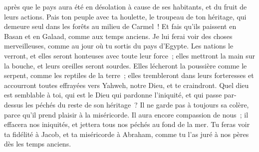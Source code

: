\begin{multicols}{2}
après que le pays aura été en désolation à cause de ses habitants, et du fruit de leurs actions.
Pais ton peuple avec ta houlette, le troupeau de ton héritage, qui demeure seul dans les forêts au milieu de Carmel~! Et fais qu'ils paissent en Basan et en Galaad, comme aux temps anciens.
Je lui ferai voir des choses merveilleuses, comme au jour où tu sortis du pays d'Egypte.
Les nations le verront, et elles seront honteuses avec toute leur force~; elles mettront la main sur la bouche, et leurs oreilles seront sourdes.
Elles lécheront la poussière comme le serpent, comme les reptiles de la terre~; elles trembleront dans leurs forteresses et accourront toutes effrayées vers Yahweh, notre Dieu, et te craindront.
Quel dieu est semblable à toi, qui est le Dieu qui pardonne l'iniquité, et qui passe par-dessus les péchés du reste de son héritage~? Il ne garde pas à toujours sa colère, parce qu'il prend plaisir à la miséricorde.
Il aura encore compassion de nous~; il effacera nos iniquités, et jettera tous nos péchés au fond de la mer.
Tu feras voir ta fidélité à Jacob, et ta miséricorde à Abraham, comme tu l'as juré à nos pères dès les temps anciens.
\PPE{}
\end{multicols}
